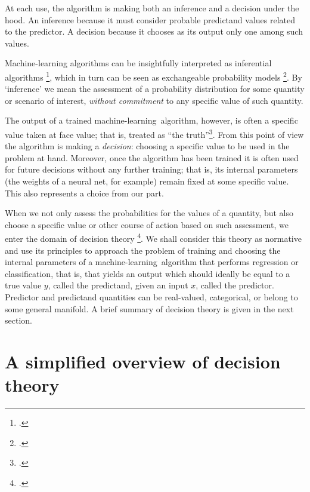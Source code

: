 \documentclass[\ifafour a4paper,12pt,\else a5paper,10pt,\fi%
onecolumn,oneside,article,%
british%
]{memoir}
\theoremstyle{remark}
\theoremstyle{innote}
\newcommand*{\citep}{\footcites}
\renewcommand*{\|}[1][]{\nonscript\:#1\vert\nonscript\:\mathopen{}}
\renewcommand*{\=}{\TextOrMath\texteq\eq}
\newcommand*{\sect}{\S}%
\newcommand*{\chap}{ch.}%
\newcommand*{\chaps}{chs}%
\newcommand*{\cf}{{cf.}}
\newcommand*{\ml}{machine-learning}
\begin{document}
At each use, the algorithm is making both an inference and a decision under
the hood. An inference because it must consider probable predictand values
related to the predictor. A decision because it chooses as its output only
one among such values.






Machine-learning algorithms can be insightfully interpreted as inferential
algorithms
\citep{tishbyetal1989,levinetal1990,mackay1992,mackay1992b,mackay1992c,mackay1992d}[esp.
Part~V]{mackay1995_r2005}{neal1996}, which in turn can be seen as
exchangeable probability models \citep[\chap~4]{bernardoetal1994_r2000}. By
\enquote*{inference} we mean the assessment of a probability distribution
for some quantity or scenario of interest, \emph{without commitment} to any
specific value of such quantity.

The output of a trained \ml\ algorithm, however, is often a specific value
taken at face value; that is, treated as \enquote{the
  truth}\citep[\cf][\sect~3]{mackay1992b}. From this point of view the
algorithm is making a \emph{decision}: choosing a specific value to be used
in the problem at hand. Moreover, once the algorithm has been trained it is
often used for future decisions without any further training; that is, its
internal parameters (the weights of a neural net, for example) remain fixed
at some specific value. This also represents a choice from our part.

When we not only assess the probabilities for the values of a quantity, but
also choose a specific value or other course of action based on such
assessment, we enter the domain of decision theory
\citep{savage1954_r1972,raiffaetal1961_r2000,berger1980_r1985}[\chap~2]{bernardoetal1994_r2000}{prattetal1995_r1996}[\chaps~13--14]{jaynes1994_r2003}[for
a charming introduction see][]{raiffa1968_r1970}. We shall consider this
theory as normative and use its principles to approach the problem of
training and choosing the internal parameters of a \ml\ algorithm that
performs regression or classification, that is, that yields an output which
should ideally be equal to a true value $y$, called the predictand, given
an input $x$, called the predictor. Predictor and predictand quantities can
be real-valued, categorical, or belong to some general manifold. A brief
summary of decision theory is given in the next section.

\section{A simplified overview of decision theory}
\label{sec:dec_theory_overview}
\end{document}
